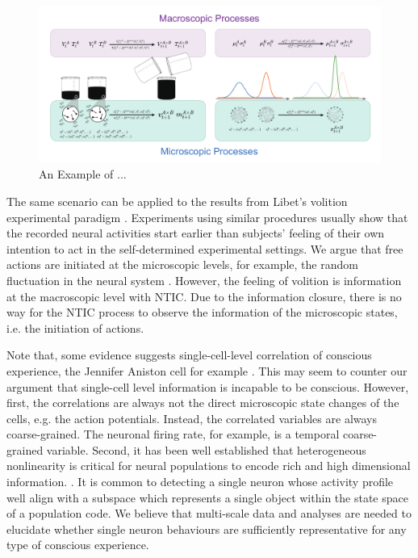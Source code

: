 \documentclass[utf8]{article}
\begin{document}
		\begin{figure}[H]
			\includegraphics[width=1.3\textwidth]{WritingMaterials/Fig_Temperature_Example/ExampleOfCG.pdf}
			\centering
			\caption{An Example of ...}
			\label{fig:TemperatureExample}
		\end{figure}         
        
        
        The same scenario can be applied to the results from Libet's volition experimental paradigm \citep{Libet1983TimeOC, Libet1985Dec}. Experiments using similar procedures usually show that the recorded neural activities start earlier than subjects' feeling of their own intention to act in the self-determined experimental settings. We argue that free actions are initiated at the microscopic levels, for example, the random fluctuation in the neural system \citep{schurger_accumulator_2012}. However, the feeling of volition is information at the macroscopic level with NTIC. Due to the information closure, there is no way for the NTIC process to observe the information of the microscopic states, i.e. the initiation of actions. 
        
    
          Note that, some evidence suggests single-cell-level correlation of conscious experience, the Jennifer Aniston cell for example \citep{Quiroga2005Jun, Quiroga2012Jul}. This may seem to counter our argument that single-cell level information is incapable to be conscious. However, first, the correlations are always not the direct microscopic state changes of the cells, e.g. the action potentials. Instead, the correlated variables are always coarse-grained. The neuronal firing rate, for example, is a temporal coarse-grained variable. Second, it has been well established that heterogeneous nonlinearity is critical for neural populations to encode rich and high dimensional information. \citep{Chelaru2008, Rigotti2010Oct, Shamir2004Jun}. It is common to detecting a single neuron whose activity profile well align with a subspace which represents a single object within the state space of a population code. We believe that multi-scale data and analyses are needed to elucidate whether single neuron behaviours are sufficiently representative for any type of conscious experience. 
\end{document}
